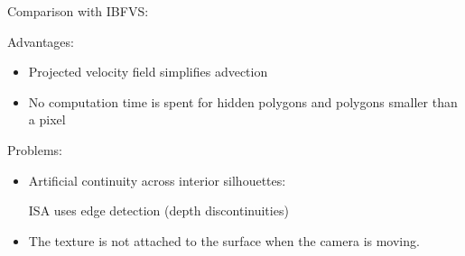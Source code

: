 Comparison with IBFVS:
\begin{description}
\item Advantages:
    \begin{itemize}
        \item Projected velocity field simplifies advection
        \item No computation time is spent for hidden polygons and polygons smaller than a pixel
    \end{itemize}
\item Problems:
    \begin{itemize}
        \item Artificial continuity across interior silhouettes:
        
        ISA uses edge detection (depth discontinuities)
        
        \item The texture is not attached to the surface when the camera is moving.
    \end{itemize}

\end{description}

































